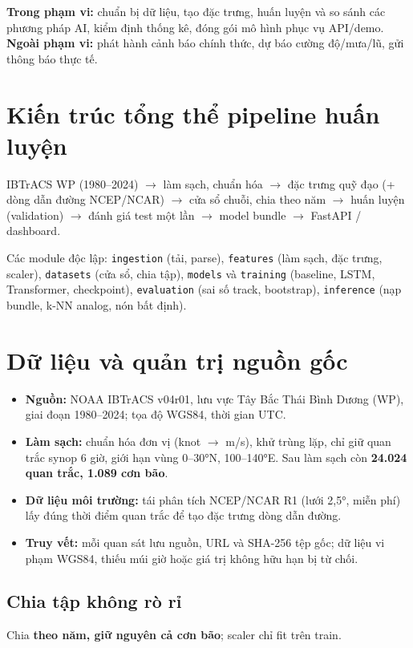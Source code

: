 \documentclass[12pt,a4paper]{article}
\begin{document}
\noindent\textbf{Trong phạm vi:} chuẩn bị dữ liệu, tạo đặc trưng, huấn luyện và so
sánh các phương pháp AI, kiểm định thống kê, đóng gói mô hình phục vụ API/demo.\\
\textbf{Ngoài phạm vi:} phát hành cảnh báo chính thức, dự báo cường độ/mưa/lũ,
gửi thông báo thực tế.

\section{Kiến trúc tổng thể pipeline huấn luyện}
\begin{center}
\small IBTrACS WP (1980--2024) $\rightarrow$ làm sạch, chuẩn hóa $\rightarrow$
đặc trưng quỹ đạo (+ dòng dẫn đường NCEP/NCAR) $\rightarrow$ cửa sổ chuỗi, chia theo năm
$\rightarrow$ huấn luyện (validation) $\rightarrow$ đánh giá test một lần
$\rightarrow$ model bundle $\rightarrow$ FastAPI / dashboard.
\end{center}
Các module độc lập: \texttt{ingestion} (tải, parse), \texttt{features} (làm sạch,
đặc trưng, scaler), \texttt{datasets} (cửa sổ, chia tập), \texttt{models} và
\texttt{training} (baseline, LSTM, Transformer, checkpoint), \texttt{evaluation}
(sai số track, bootstrap), \texttt{inference} (nạp bundle, k-NN analog, nón bất định).

\section{Dữ liệu và quản trị nguồn gốc}
\begin{itemize}
  \item \textbf{Nguồn:} NOAA IBTrACS v04r01, lưu vực Tây Bắc Thái Bình Dương (WP),
        giai đoạn 1980--2024; tọa độ WGS84, thời gian UTC.
  \item \textbf{Làm sạch:} chuẩn hóa đơn vị (knot $\rightarrow$ m/s), khử trùng lặp,
        chỉ giữ quan trắc synop 6 giờ, giới hạn vùng 0--30°N, 100--140°E.
        Sau làm sạch còn \textbf{24.024 quan trắc, 1.089 cơn bão}.
  \item \textbf{Dữ liệu môi trường:} tái phân tích NCEP/NCAR R1 (lưới 2,5°, miễn phí)
        lấy đúng thời điểm quan trắc để tạo đặc trưng dòng dẫn đường.
  \item \textbf{Truy vết:} mỗi quan sát lưu nguồn, URL và SHA-256 tệp gốc; dữ liệu
        vi phạm WGS84, thiếu múi giờ hoặc giá trị không hữu hạn bị từ chối.
\end{itemize}

\subsection*{Chia tập không rò rỉ}
Chia \textbf{theo năm, giữ nguyên cả cơn bão}; scaler chỉ fit trên train.
\end{document}
